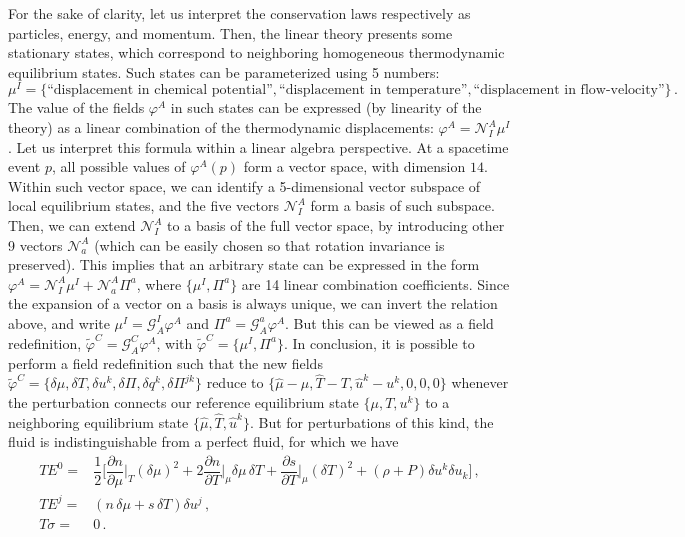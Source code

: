 \documentclass[a4paper, amsfonts, amssymb, amsmath, reprint, showkeys, nofootinbib, twoside, onecolumn,notitlepage]{revtex4-1}
\begin{document}
For the sake of clarity, let us interpret the conservation laws respectively as  particles, energy, and momentum. Then, the linear theory presents some stationary states, which correspond to neighboring homogeneous thermodynamic equilibrium states. Such states can be parameterized using 5 numbers: 
\begin{equation}
  \mu^I=\{\text{``displacement in chemical potential''},\text{``displacement in temperature''}, \text{``displacement in flow-velocity''}\}\, .  
\end{equation}
The value of the fields $\varphi^A$ in such states can be expressed (by linearity of the theory) as a linear combination of the thermodynamic displacements: $\varphi^A = \mathcal{N}^A_I \mu^I$. Let us interpret this formula within a linear algebra perspective. At a spacetime event $p$, all possible values of $\varphi^A(p)$ form a vector space, with dimension $14$. Within such vector space, we can identify a 5-dimensional vector subspace of local equilibrium states, and the five vectors $\mathcal{N}_I^A$ form a basis of such subspace. Then, we can extend $\mathcal{N}^A_I$ to a basis of the full vector space, by introducing other 9 vectors $\mathcal{N}_a^A$ (which can be easily chosen so that rotation invariance is preserved). This implies that an arbitrary state can be expressed in the form $\varphi^A=\mathcal{N}^A_I \mu^I +\mathcal{N}^A_a  \Pi^a$, where $\{\mu^I, \Pi^a \}$ are 14 linear combination coefficients. Since the expansion of a vector on a basis is always unique, we can invert the relation above, and write $\mu^I = \mathcal{G}^I_A \varphi^A$ and $\Pi^a = \mathcal{G}^a_A \varphi^A$. But this can be viewed as a field redefinition, $\tilde{\varphi}^C = \mathcal{G}^C_A \varphi^A$, with $\tilde{\varphi}^C= \{\mu^I ,\Pi^a \}$. In conclusion, it is possible to perform a field redefinition such that the new fields  $\tilde{\varphi}^C =\{\delta \mu,\delta T ,\delta u^k,\delta \Pi,\delta q^k, \delta \Pi^{jk} \}$ reduce to $\{\hat{\mu}-\mu,\hat{T}- T,\hat{u}^k-u^k,0,0, 0 \}$ whenever the perturbation connects our reference equilibrium state $\{\mu,T,u^k\}$ to a neighboring equilibrium state $\{ \hat{\mu},\hat{T},\hat{u}^k \}$. But for perturbations of this kind, the fluid is indistinguishable from a perfect fluid, for which we have \cite{GavassinoCausality2021}
\begin{equation}\label{tretisette}
\begin{split}
 TE^0 ={}& \dfrac{1}{2} \bigg[ \dfrac{\partial n}{\partial \mu}\bigg|_T (\delta \mu)^2+ 2\dfrac{\partial n}{\partial T}\bigg|_\mu \delta \mu \, \delta T + \dfrac{\partial s}{\partial T}\bigg|_\mu (\delta T)^2 + (\rho+P)\delta u^k \delta u_k \bigg] \, , \\
TE^j ={}& (n\, \delta \mu  + s \, \delta T) \delta u^j \, ,\\
T\sigma ={}& 0 \, .\\
\end{split}
\end{equation}
\end{document}
